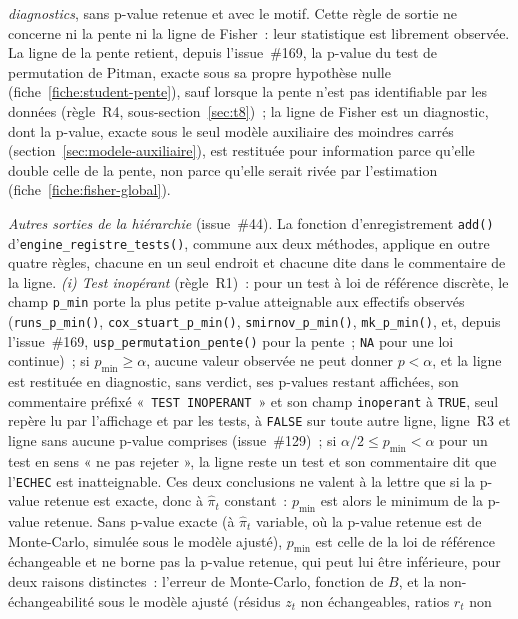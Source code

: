 \documentclass[a4paper,11pt]{article}
\newcommand{\code}[1]{\texttt{\small #1}}
\begin{document}
\begin{encadre}
\emph{diagnostics}, sans p-value retenue et avec le motif. Cette règle de
sortie ne concerne ni la pente ni la ligne de Fisher~: leur statistique est
librement observée. La ligne de la pente retient, depuis l'issue~\#169, la p-value
du test de permutation de Pitman, exacte sous sa propre hypothèse nulle
(fiche~\ref{fiche:student-pente}), sauf lorsque la pente n'est pas identifiable
par les données (règle~R4, sous-section~\ref{sec:t8})~; la ligne de Fisher est un
diagnostic, dont la p-value, exacte sous le seul modèle auxiliaire des moindres
carrés (section~\ref{sec:modele-auxiliaire}), est restituée pour information
parce qu'elle double celle de la pente, non parce qu'elle serait rivée par
l'estimation (fiche~\ref{fiche:fisher-global}).
\end{encadre}

\emph{Autres sorties de la hiérarchie} (issue~\#44). La fonction d'enregistrement
\code{add()} d'\code{engine\_registre\_}\allowbreak\code{tests()}, commune aux deux méthodes, applique en outre
quatre règles, chacune en un seul endroit et chacune dite dans le commentaire de la ligne.
\emph{(i) Test inopérant} (règle~R1)~: pour un test à loi de référence discrète, le champ
\code{p\_min} porte la plus petite p-value atteignable aux effectifs observés
(\code{runs\_p\_min()}, \code{cox\_stuart\_p\_min()}, \code{smirnov\_p\_min()},
\code{mk\_p\_min()}, et, depuis l'issue~\#169, \code{usp\_permutation\_pente()} pour la pente~;
\code{NA} pour une loi continue)~; si $p_{\min} \ge \alpha$, aucune valeur
observée ne peut donner $p < \alpha$, et la ligne est restituée en diagnostic, sans verdict, ses
p-values restant affichées, son commentaire préfixé «~\code{TEST INOPERANT}~» et son champ
\code{inoperant} à \code{TRUE}, seul repère lu par l'affichage et par les tests, à
\code{FALSE} sur toute autre ligne, ligne~R3 et ligne sans aucune p-value comprises
(issue~\#129)~; si $\alpha/2 \le p_{\min} < \alpha$ pour un test en sens « ne pas
rejeter », la ligne reste un test et son commentaire dit que l'\code{ECHEC} est inatteignable.
Ces deux conclusions ne valent à la lettre que si la p-value retenue est exacte, donc à
$\hat\pi_t$ constant~: $p_{\min}$ est alors le minimum de la p-value retenue. Sans p-value exacte
(à $\hat\pi_t$ variable, où la p-value retenue est de Monte-Carlo, simulée sous le modèle ajusté),
$p_{\min}$ est celle de la loi de référence échangeable et ne borne pas la p-value retenue, qui
peut lui être inférieure, pour deux raisons distinctes~: l'erreur de Monte-Carlo, fonction de $B$,
et la non-échangeabilité sous le modèle ajusté (résidus $z_t$ non échangeables, ratios $r_t$ non
\end{document}
